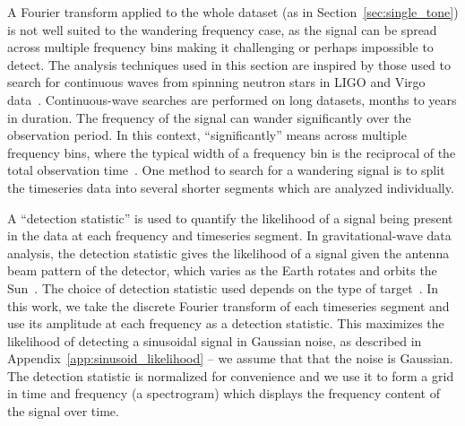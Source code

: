 \documentclass[paper-main.tex]{subfiles}
\begin{document}
A Fourier transform applied to the whole dataset (as in Section~\ref{sec:single_tone}) is not well suited to the wandering frequency case, as the signal can be spread across multiple frequency bins making it challenging or perhaps impossible to detect. 
The analysis techniques used in this section are inspired by those used to search for continuous waves from spinning neutron stars in LIGO and Virgo data~\cite{SuvorovaEtAl:2016,SuvorovaEtAl:2017}. 
Continuous-wave searches are performed on long datasets, months to years in duration. 
The frequency of the signal can wander significantly over the observation period. 
In this context, ``significantly'' means across multiple frequency bins, where the typical width of a frequency bin is the reciprocal of the total observation time~\cite{JKS:1998,ScoX1O2Viterbi:2019}.
One method to search for a wandering signal is to split the timeseries data into several shorter segments which are analyzed individually.%

A ``detection statistic'' is used to quantify the likelihood of a signal being present in the data at each frequency and timeseries segment. 
In gravitational-wave data analysis, the detection statistic gives the likelihood of a signal given the antenna beam pattern of the detector, which varies as the Earth rotates and orbits the Sun~\cite{JKS:1998}. 
The choice of detection statistic used depends on the type of target~\cite{JKS:1998,SuvorovaEtAl:2017}.
In this work, we take the discrete Fourier transform of each timeseries segment and use its amplitude at each frequency as a detection statistic.
This maximizes the likelihood of detecting a sinusoidal signal in Gaussian noise, as described in Appendix~\ref{app:sinusoid_likelihood} -- we assume that that the noise is Gaussian.
The detection statistic is normalized for convenience and we use it to form a grid in time and frequency (a spectrogram) which displays the frequency content of the signal over time. 
\end{document}
